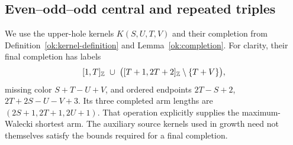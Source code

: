 \subsection{Even--odd--odd central and repeated triples}
\label{mc:eoo-central-section}

We use the upper-hole kernels $K(S,U,T,V)$ and their completion from
Definition~\ref{ok:kernel-definition} and Lemma~\ref{ok:completion}.
For clarity, their final completion has labels
\[
 [1,T]_{\mathbb Z}\ \cup\
 \bigl([T+1,2T+2]_{\mathbb Z}\setminus\{T+V\}\bigr),
\]
missing color $S+T-U+V$, and ordered endpoints
$2T-S+2$, $2T+2S-U-V+3$.  Its three completed arm lengths are
$(2S+1,2T+1,2U+1)$.  That operation explicitly supplies the
maximum-Walecki shortest arm.  The auxiliary source kernels used in
growth need not themselves satisfy the bounds required for a final
completion.

